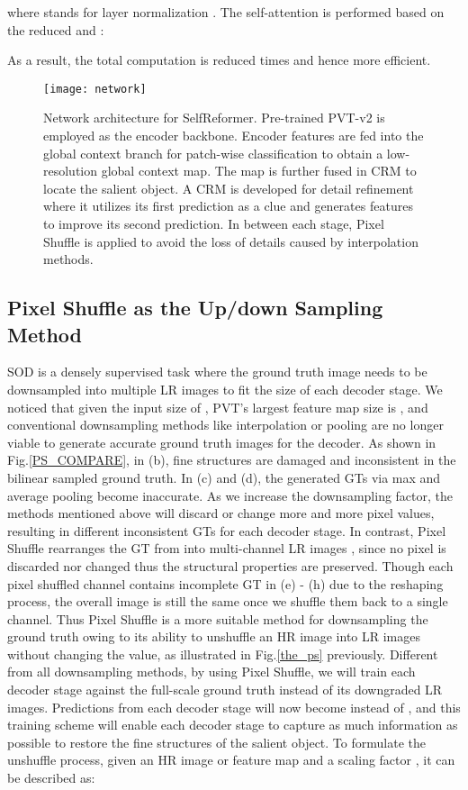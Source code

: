 \documentclass[letterpaper]{article} \usepackage{aaai22}  \usepackage{times}  \usepackage{helvet}  \usepackage{courier}  \usepackage[hyphens]{url}  \usepackage{graphicx} \urlstyle{rm} \def\UrlFont{\rm}  \usepackage{natbib}  \usepackage{caption} \DeclareCaptionStyle{ruled}{labelfont=normalfont,labelsep=colon,strut=off} \frenchspacing  \setlength{\pdfpagewidth}{8.5in}  \setlength{\pdfpageheight}{11in}  \usepackage{algorithm}
\begin{document}
where  stands for layer normalization \cite{LN}. The self-attention is performed based on the reduced  and :

 As a result, the total computation is reduced  times and hence more efficient.

\begin{figure*}[!t]
\begin{center}
\texttt{[image: network]}
\end{center}
\caption{Network architecture for SelfReformer. Pre-trained PVT-v2 is employed as the encoder backbone. Encoder features are fed into the global context branch for patch-wise classification to obtain a low-resolution global context map. The map is further fused in CRM to locate the salient object. A CRM is developed for detail refinement where it utilizes its first prediction as a clue and generates features to improve its second prediction. In between each stage, Pixel Shuffle is applied to avoid the loss of details caused by interpolation methods.}
\label{fig:network}
\vspace{-0.02\linewidth}
\end{figure*}

\subsection{Pixel Shuffle as the Up/down Sampling Method}
SOD is a densely supervised task where the ground truth image needs to be downsampled into multiple LR images to fit the size of each decoder stage. We noticed that given the input size of , PVT's largest feature map size is , and conventional downsampling methods like interpolation or pooling are no longer viable to generate accurate ground truth images for the decoder. As shown in Fig.\ref{PS_COMPARE}, in (b), fine structures are damaged and inconsistent in the bilinear sampled ground truth. In (c) and (d), the generated GTs via max and average pooling become inaccurate. As we increase the downsampling factor, the methods mentioned above will discard or change more and more pixel values, resulting in different inconsistent GTs for each decoder stage. In contrast, Pixel Shuffle rearranges the GT from  into multi-channel LR images , since no pixel is discarded nor changed thus the structural properties are preserved. Though each pixel shuffled channel contains incomplete GT in (e) - (h) due to the reshaping process, the overall image is still the same once we shuffle them back to a single channel. Thus Pixel Shuffle is a more suitable method for downsampling the ground truth owing to its ability to unshuffle an HR image into LR images without changing the value, as illustrated in Fig.\ref{the_ps} previously. Different from all downsampling methods, by using Pixel Shuffle, we will train each decoder stage against the full-scale ground truth instead of its downgraded LR images. Predictions from each decoder stage will now become  instead of , and this training scheme will enable each decoder stage to capture as much information as possible to restore the fine structures of the salient object. To formulate the unshuffle process, given an HR image or feature map  and a scaling factor , it can be described as:
\end{document}
